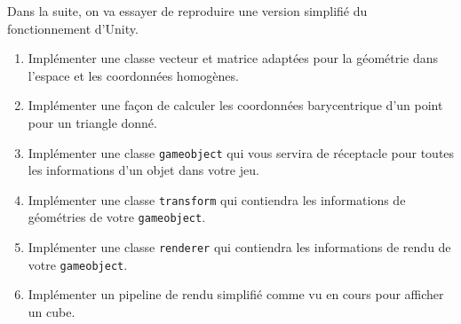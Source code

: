 \documentclass[a4paper,12pt]{article}
\begin{document}
\label{exo:impl}

Dans la suite, on va essayer de reproduire une version simplifié du fonctionnement d'Unity. 

\begin{enumerate}
  \item Implémenter une classe vecteur et matrice adaptées pour la géométrie dans l'espace et les coordonnées homogènes.
  \item Implémenter une façon de calculer les coordonnées barycentrique d'un point pour un triangle donné. 
  \item Implémenter une classe \texttt{gameobject} qui vous servira de réceptacle pour toutes les informations d'un objet dans votre jeu.
  \item Implémenter une classe \texttt{transform} qui contiendra les informations de géométries de votre \texttt{gameobject}.
  \item Implémenter une classe \texttt{renderer} qui contiendra les informations de rendu de votre \texttt{gameobject}.
  \item Implémenter un pipeline de rendu simplifié comme vu en cours pour afficher un cube.
\end{enumerate}
\end{document}
